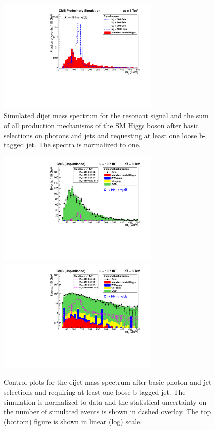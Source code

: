 \begin{figure}[ht]
 \begin{center}
    \includegraphics[width=0.70\textwidth]{figures/objects/DiJetMass_OnlyHiggs.pdf}
 \end{center}
\caption{Simulated dijet mass spectrum for the resonant signal and the sum of all production
mechanisms of the
SM Higgs boson after basic selections on photons and jets and requesting at least one loose
b-tagged jet.
The spectra is normalized to one.}
\label{fig:mjj_onlyhiggs}
\end{figure}

\begin{figure}[ht]
 \begin{center}
   \includegraphics[width=0.70\textwidth]{figures/objects/DiJetMass_ShapeNormalized_sys.pdf}
   \includegraphics[width=0.70\textwidth]{figures/objects/DiJetMass_ShapeNormalized_Log_sys.pdf}
 \end{center}
\caption{Control plots for the dijet mass spectrum after basic photon and jet selections
and requiring at least one loose b-tagged jet. The simulation is normalized to data and
the statistical uncertainty on the number of simulated events is shown in dashed overlay.
The top (bottom) figure is shown in linear (log) scale.}
\label{fig:mjj_controlplot}
\end{figure}

